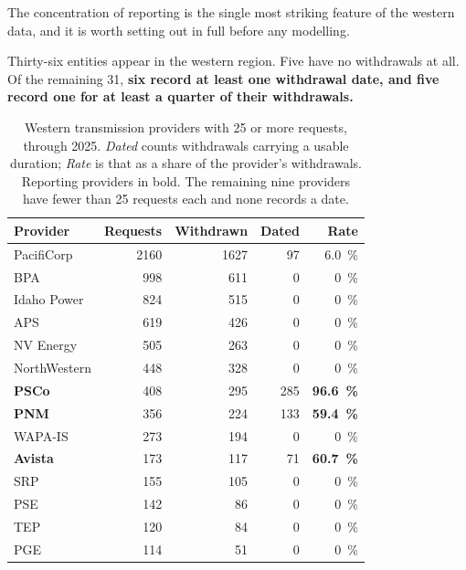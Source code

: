 \documentclass[11pt,a4paper]{article}
\begin{document}
The concentration of reporting is the single most striking feature of the western
data, and it is worth setting out in full before any modelling.

Thirty-six entities appear in the western region. Five have no withdrawals at
all. Of the remaining 31, \textbf{six record at least one withdrawal date, and
five record one for at least a quarter of their withdrawals.}

\begin{table}[htbp]
\centering
\caption{Western transmission providers with 25 or more requests, through 2025.
\emph{Dated} counts withdrawals carrying a usable duration; \emph{Rate} is that
as a share of the provider's withdrawals. Reporting providers in bold. The
remaining nine providers have fewer than 25 requests each and none records a
date.}
\begin{tabular}{lrrrr}
\toprule
Provider & Requests & Withdrawn & Dated & Rate \\
\midrule
PacifiCorp        & \num{2160} & \num{1627} & 97  & \SI{6.0}{\percent} \\
BPA               & \num{998}  & \num{611}  & 0   & \SI{0}{\percent} \\
Idaho Power       & \num{824}  & \num{515}  & 0   & \SI{0}{\percent} \\
APS               & \num{619}  & \num{426}  & 0   & \SI{0}{\percent} \\
NV Energy         & \num{505}  & \num{263}  & 0   & \SI{0}{\percent} \\
NorthWestern      & \num{448}  & \num{328}  & 0   & \SI{0}{\percent} \\
\textbf{PSCo}     & \num{408}  & \num{295}  & \num{285} & \textbf{\SI{96.6}{\percent}} \\
\textbf{PNM}      & \num{356}  & \num{224}  & \num{133} & \textbf{\SI{59.4}{\percent}} \\
WAPA-IS           & \num{273}  & \num{194}  & 0   & \SI{0}{\percent} \\
\textbf{Avista}   & \num{173}  & \num{117}  & 71  & \textbf{\SI{60.7}{\percent}} \\
SRP               & \num{155}  & \num{105}  & 0   & \SI{0}{\percent} \\
PSE               & \num{142}  & \num{86}   & 0   & \SI{0}{\percent} \\
TEP               & \num{120}  & \num{84}   & 0   & \SI{0}{\percent} \\
PGE               & \num{114}  & \num{51}   & 0   & \SI{0}{\percent} \\

\end{tabular}
\end{table}
\end{document}
